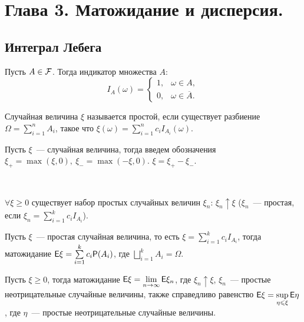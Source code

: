 \section{Глава 3. Матожидание и дисперсия.}

\subsection{Интеграл Лебега}
\begin{definition}
    Пусть $A \in \mathcal{F}$. Тогда индикатор множества $A$:
    \begin{equation*}
        I_A(\omega) = 
         \begin{cases}
           1,    &   \omega \in A,   \\
           0,    &   \omega \in \overline{A}.
         \end{cases}
        \end{equation*}
\end{definition}

\begin{definition}
    Случайная величина $\xi$ называется простой, если существует разбиение $\Omega = \sum\limits_{i=1}^nA_i$, такое что $ \xi(\omega) = \sum\limits_{i=1}^n c_iI_{A_i}(\omega)$.
\end{definition}

\begin{definition}
    Пусть $\xi$~--- случайная величина, тогда введем обозначения $\xi_+ = \max(\xi, 0),\  \xi_- = \max(-\xi, 0)$. $\xi = \xi_+ - \xi_-$.
\end{definition}

\begin{lemma}[][б/д]~

	$\forall \xi \geqslant 0$ существует набор простых случайных величин $\xi_n$: $\xi_n \uparrow \xi$ ($\xi_n$~--- простая, если $\xi_n = \sum\limits_{i = 1}^k c_iI_{A_i}$).
\end{lemma}

\begin{definition}
	Пусть $\xi$~--- простая случайная величина, то есть $\xi = \sum\limits_{i = 1}^k c_iI_{A_i}$, тогда матожидание $\mathsf{E} \xi = \sum\limits_{i = 1}^k c_i\mathsf{P}(A_i)$, где $\bigsqcup\limits_{i=1}^k A_i = \Omega$.
\end{definition}

\begin{definition}
	Пусть $\xi \geqslant 0$, тогда матожидание $\mathsf{E} \xi = \lim\limits_{n \rightarrow \infty} \mathsf{E} \xi_n$, где $\xi_n \uparrow \xi$, $\xi_n$~--- простые неотрицательные случайные величины, также справедливо равенство $\mathsf{E} \xi = \sup\limits_{\eta \leqslant \xi}\mathsf{E}\eta$, где $\eta$~--- простые неотрицательные случайные величины. 
\end{definition}


